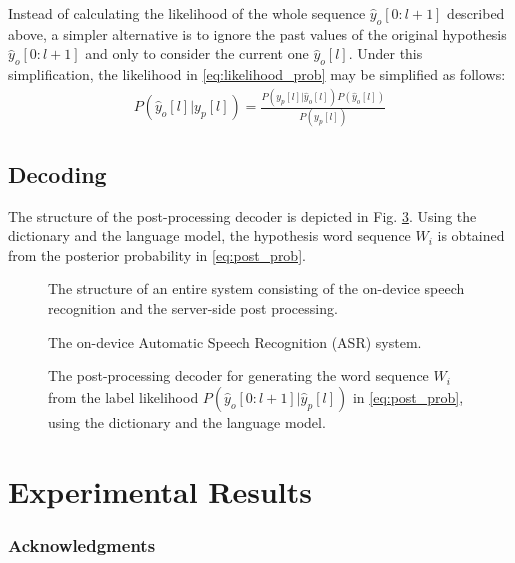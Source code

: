 \documentclass{article}
\begin{document}
Instead of calculating the likelihood of the whole sequence 
$\hat{y}_o[0:l+1]$ described above, a simpler alternative is to ignore
the past values of the original hypothesis $\hat{y}_o[0:l+1]$ and only to
consider the current one $\hat{y}_o[l]$. Under this simplification,
the likelihood in \eqref{eq:likelihood_prob} may be simplified as follows:
\begin{align}
  P(\hat{y}_o[l] \big| y_p[l]) 
    = \frac{P (y_p[l] \big| \hat{y}_o[l]) P(\hat{y}_o[l])}{P(y_p[l])} 
\end{align}

\subsection{Decoding}
\label{sec:decoding}
The structure of the post-processing decoder is depicted in Fig.
\ref{fig:post_processing_decoder}. Using the dictionary and the
language model, the hypothesis word sequence $W_i$ is obtained
from the posterior probability in \eqref{eq:post_prob}.




\begin{figure}
  \centering
    \centering
    \resizebox{130mm}{!}{
      
    }
    \caption {
      The structure of an entire system consisting of the on-device speech 
      recognition and the server-side post processing. 
      \label{fig:entire_system}
    }
\end{figure}


\begin{figure}
  \centering
    \centering
    \resizebox{55mm}{!}{
      
    }
    \caption {
      The on-device Automatic Speech Recognition (ASR) system.
      \label{fig:asr_system}
    }
\end{figure}


\begin{figure}
    \centering
    \resizebox{70mm}{!}{
      
    } 
    \caption {
      The post-processing decoder for generating the word sequence $W_i$
      from the label likelihood $P(\hat{y}_o[0:l+1] | \hat{y}_p[l])$ in \eqref{eq:post_prob}, 
      using the dictionary and the language model.
      \label{fig:post_processing_decoder}
    }
\end{figure}




\section{Experimental Results}
\label{sec:experimental_results}


\subsubsection*{Acknowledgments}



\small

\clearpage
\newpage


\end{document}
